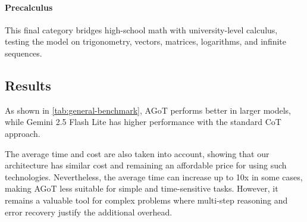 \documentclass[12pt,a4paper,openright,twoside]{book}
\begin{document}
\paragraph{Precalculus}{This final category bridges high-school math with university-level calculus, testing the model on trigonometry, vectors, matrices, logarithms, and infinite sequences.}

\subsection{Results}
\begin{table}[ht]
  \centering
  \caption{LLM general benchmark results}
  \label{tab:general-benchmark}
\end{table}

As shown in \cref{tab:general-benchmark}, \ac{AGoT} performs better in larger models, while Gemini 2.5 Flash Lite has higher performance with the standard \ac{CoT} approach.

The average time and cost are also taken into account, showing that our architecture has similar cost and remaining an affordable price for using such technologies.
Nevertheless, the average time can increase up to 10x in some cases, making \ac{AGoT} less suitable for simple and time-sensitive tasks. 
However, it remains a valuable tool for complex problems where multi-step reasoning and error recovery justify the additional overhead.
\end{document}
